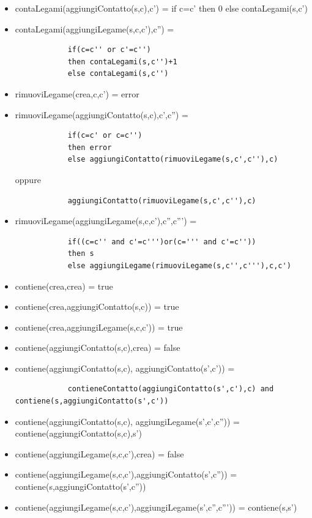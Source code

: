 \documentclass{article}
\begin{document}
\begin{itemize}
		\item contaLegami(aggiungiContatto(s,c),c') = if c=c' then 0 else contaLegami(s,c')
		\item contaLegami(aggiungiLegame(s,c,c'),c'') = 
		\begin{verbatim}
			if(c=c'' or c'=c'') 
			then contaLegami(s,c'')+1
			else contaLegami(s,c'')
		\end{verbatim}
		\item rimuoviLegame(crea,c,c') = error
		\item rimuoviLegame(aggiungiContatto(s,c),c',c'') = 
		\begin{verbatim}
			if(c=c' or c=c'')
			then error
			else aggiungiContatto(rimuoviLegame(s,c',c''),c)
		\end{verbatim}
		oppure
		\begin{verbatim}
			aggiungiContatto(rimuoviLegame(s,c',c''),c)
		\end{verbatim}
		\item rimuoviLegame(aggiungiLegame(s,c,c'),c'',c''') =
		\begin{verbatim}
			if((c=c'' and c'=c''')or(c=''' and c'=c''))
			then s
			else aggiungiLegame(rimuoviLegame(s,c'',c'''),c,c')
		\end{verbatim}
		\item contiene(crea,crea) = true
		\item contiene(crea,aggiungiContatto(s,c)) = true
		\item contiene(crea,aggiungiLegame(s,c,c')) = true
		\item contiene(aggiungiContatto(s,c),crea) = false
		\item contiene(aggiungiContatto(s,c), aggiungiContatto(s',c')) = 
		\begin{verbatim}
			contieneContatto(aggiungiContatto(s',c'),c) and contiene(s,aggiungiContatto(s',c'))
		\end{verbatim}
		\item contiene(aggiungiContatto(s,c), aggiungiLegame(s',c',c'')) = contiene(aggiungiContatto(s,c),s')
		\item contiene(aggiungiLegame(s,c,c'),crea) = false
		\item contiene(aggiungiLegame(s,c,c'),aggiungiContatto(s',c'')) = contiene(s,aggiungiContatto(s',c''))
		\item contiene(aggiungiLegame(s,c,c'),aggiungiLegame(s',c'',c''')) = contiene(s,s')
	\end{itemize}
	\newpage
\end{document}
